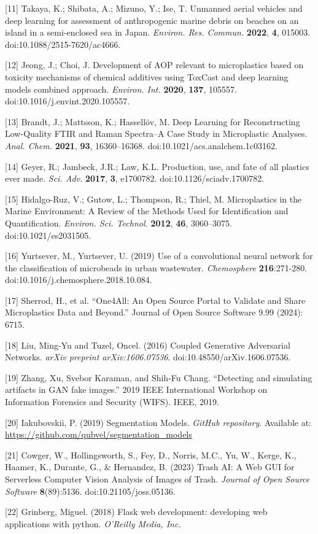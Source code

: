 \documentclass{article}
\begin{document}
{[11] Takaya, K.; Shibata, A.; Mizuno, Y.; Ise, T. Unmanned aerial vehicles and deep learning for assessment of anthropogenic marine debris on beaches on an island in a semi-enclosed sea in Japan. {\it Environ. Res. Commun.} {\bf 2022}, {\bf 4}, 015003. doi:10.1088/2515-7620/ac4666.

[12] Jeong, J.; Choi, J. Development of AOP relevant to microplastics based on toxicity mechanisms of chemical additives using ToxCast\texttrademark{} and deep learning models combined approach. {\it Environ. Int.} {\bf 2020}, {\bf 137}, 105557. doi:10.1016/j.envint.2020.105557.

[13] Brandt, J.; Mattsson, K.; Hassell\"{o}v, M. Deep Learning for Reconstructing Low-Quality FTIR and Raman Spectra--A Case Study in Microplastic Analyses. {\it Anal. Chem.} {\bf 2021}, {\bf 93}, 16360--16368. doi:10.1021/acs.analchem.1c03162.

[14] Geyer, R.; Jambeck, J.R.; Law, K.L. Production, use, and fate of all plastics ever made. {\it Sci. Adv.} {\bf 2017}, {\bf 3}, e1700782. doi:10.1126/sciadv.1700782.

[15] Hidalgo-Ruz, V.; Gutow, L.; Thompson, R.; Thiel, M. Microplastics in the Marine Environment: A Review of the Methods Used for Identification and Quantification. {\it Environ. Sci. Technol.} {\bf 2012}, {\bf 46}, 3060--3075. doi:10.1021/es2031505.

[16] Yurtsever, M., Yurtsever, U. (2019) Use of a convolutional neural network for the classification of microbeads in urban wastewater. {\it Chemosphere} {\bf 216}:271-280. doi:10.1016/j.chemosphere.2018.10.084.

[17] Sherrod, H., et al. ``One4All: An Open Source Portal to Validate and Share Microplastics Data and Beyond.'' Journal of Open Source Software 9.99 (2024): 6715.

[18] Liu, Ming-Yu and Tuzel, Oncel. (2016) Coupled Generative Adversarial Networks. \textit{arXiv preprint arXiv:1606.07536}. doi:10.48550/arXiv.1606.07536.

[19] Zhang, Xu, Svebor Karaman, and Shih-Fu Chang. ``Detecting and simulating artifacts in GAN fake images.'' 2019 IEEE International Workshop on Information Forensics and Security (WIFS). IEEE, 2019.

[20] Iakubovskii, P. (2019) Segmentation Models. {\it GitHub repository}. Available at: \url{https://github.com/qubvel/segmentation_models}

[21] Cowger, W., Hollingsworth, S., Fey, D., Norris, M.C., Yu, W., Kerge, K., Haamer, K., Durante, G., \& Hernandez, B. (2023) Trash AI: A Web GUI for Serverless Computer Vision Analysis of Images of Trash. {\it Journal of Open Source Software} {\bf 8}(89):5136. doi:10.21105/joss.05136.

[22] Grinberg, Miguel. (2018) Flask web development: developing web applications with python. {\it O'Reilly Media, Inc.}

}
\end{document}
